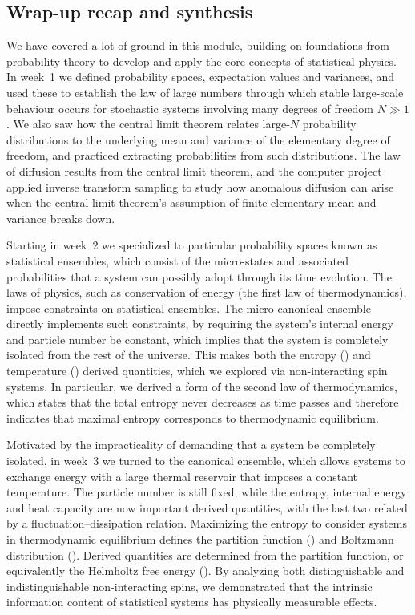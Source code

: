 \subsection{Wrap-up recap and synthesis}
We have covered a lot of ground in this module, building on foundations from probability theory to develop and apply the core concepts of statistical physics.
In week~1 we defined probability spaces, expectation values and variances, and used these to establish the law of large numbers through which stable large-scale behaviour occurs for stochastic systems involving many degrees of freedom $N \gg 1$.
We also saw how the central limit theorem relates large-$N$ probability distributions to the underlying mean and variance of the elementary degree of freedom, and practiced extracting probabilities from such distributions.
The law of diffusion results from the central limit theorem, and the computer project applied inverse transform sampling to study how anomalous diffusion can arise when the central limit theorem's assumption of finite elementary mean and variance breaks down.

Starting in week~2 we specialized to particular probability spaces known as statistical ensembles, which consist of the micro-states and associated probabilities that a system can possibly adopt through its time evolution.
The laws of physics, such as conservation of energy (the first law of thermodynamics), impose constraints on statistical ensembles.
The micro-canonical ensemble directly implements such constraints, by requiring the system's internal energy and particle number be constant, which implies that the system is completely isolated from the rest of the universe.
This makes both the entropy () and temperature () derived quantities, which we explored via non-interacting spin systems.
In particular, we derived a form of the second law of thermodynamics, which states that the total entropy never decreases as time passes and therefore indicates that maximal entropy corresponds to thermodynamic equilibrium.

Motivated by the impracticality of demanding that a system be completely isolated, in week~3 we turned to the canonical ensemble, which allows systems to exchange energy with a large thermal reservoir that imposes a constant temperature.
The particle number is still fixed, while the entropy, internal energy and heat capacity are now important derived quantities, with the last two related by a fluctuation--dissipation relation.
Maximizing the entropy to consider systems in thermodynamic equilibrium defines the partition function () and Boltzmann distribution ().
Derived quantities are determined from the partition function, or equivalently the Helmholtz free energy ().
By analyzing both distinguishable and indistinguishable non-interacting spins, we demonstrated that the intrinsic information content of statistical systems has physically measurable effects.

